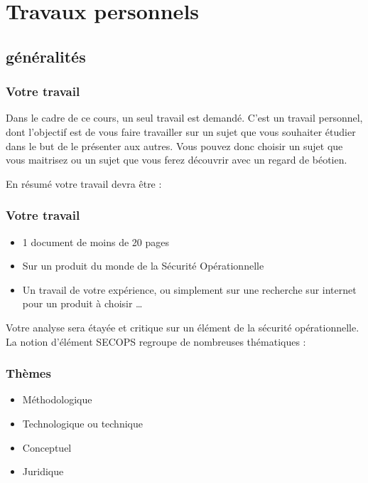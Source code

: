 


\section{Travaux personnels}

\subsection{généralités}

\begin{frame}
\frametitle<presentation>{Votre travail}
Dans le cadre de ce cours, un seul travail  est demandé. C'est un travail personnel, dont l'objectif est de vous faire travailler sur un sujet que vous souhaiter étudier dans le but de le présenter aux autres. Vous pouvez donc choisir un sujet que vous maitrisez ou un sujet que vous ferez découvrir avec un regard de béotien.
\end{frame}

En résumé votre travail devra être : 

\begin{frame}
\frametitle<presentation>{Votre travail}
\begin{itemize}
  \item  1 document de moins de 20 pages
  \item  Sur un produit du monde de la Sécurité Opérationnelle
  \item  Un travail de votre expérience, ou simplement sur une recherche sur internet pour un produit à choisir …
\end{itemize}


\end{frame}

Votre  analyse sera étayée et critique sur un élément de la sécurité opérationnelle. La notion d'élément SECOPS regroupe de nombreuses thématiques :
\begin{frame}
\frametitle<presentation>{Thèmes}
\begin{itemize}
  \item Méthodologique
  \item Technologique ou technique
  \item Conceptuel
  \item Juridique
\end{itemize}

\end{frame}



